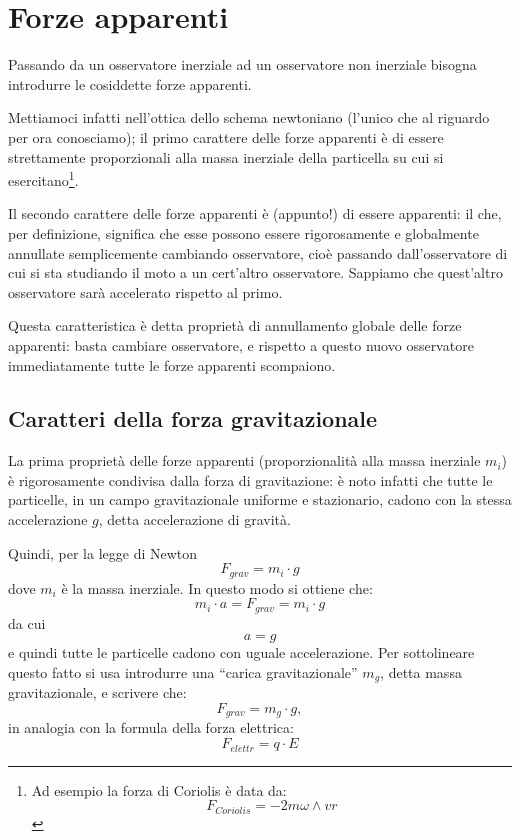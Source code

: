 \section{Forze apparenti}

Passando da un osservatore inerziale ad un osservatore non inerziale
bisogna introdurre le cosiddette forze apparenti. 

Mettiamoci infatti nell'ottica dello schema newtoniano (l'unico che al riguardo per ora conosciamo); 
il primo carattere delle forze apparenti è di essere strettamente proporzionali alla massa inerziale della particella 
su cui si esercitano\footnote{
Ad esempio la forza di Coriolis è data da:
\[F_{Coriolis} = -2m \omega  \wedge v r\]}.

Il secondo carattere delle forze apparenti è (appunto!) di essere apparenti:
il che, per definizione, significa che esse possono essere rigorosamente e globalmente 
annullate semplicemente cambiando osservatore, cioè passando dall'osservatore di cui si sta studiando 
il moto a un cert'altro osservatore. Sappiamo che quest'altro osservatore sarà accelerato rispetto al primo.

Questa caratteristica è detta proprietà di annullamento globale delle forze apparenti: basta cambiare osservatore, 
e rispetto a questo nuovo osservatore immediatamente tutte le forze apparenti scompaiono.

\subsection{Caratteri della forza gravitazionale}
La prima proprietà delle forze apparenti (proporzionalità alla massa iner\-ziale $m_i$) è
 rigorosamente condivisa dalla forza di gravitazione: è noto infatti che tutte le particelle, 
in un campo gravitazionale uniforme e stazionario, ca\-dono con la stessa accelerazione $g$, 
detta accelerazione di gravità. 

Quindi, per la legge di Newton
\begin{equation}
F_{grav} = m_{i} · g
\end{equation}
dove $m_i$ è la massa inerziale. In questo modo si ottiene che:
\begin{equation}\label{massa_inerz}
m_i · a = F_{grav} = m_i · g
\end{equation}
da cui
\begin{equation}
a = g
\end{equation}
e quindi tutte le particelle cadono con uguale accelerazione.
Per sottolineare questo fatto si usa introdurre una ``carica gravitazionale''
$m_g$, detta massa gravitazionale, e scrivere che:
\begin{equation}
F_{grav} = m_g \cdot g,
\end{equation}
in analogia con la formula della forza elettrica:
\begin{equation}
F_{elettr} = q \cdot E
\end{equation}

